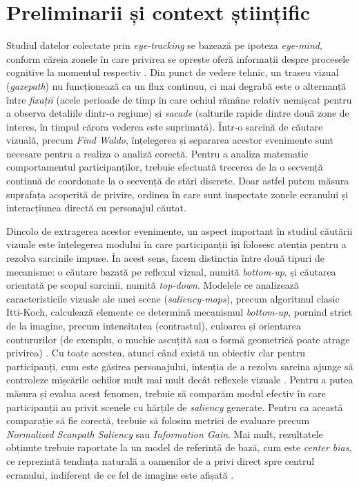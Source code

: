\section{Preliminarii și context științific}

Studiul datelor colectate prin \emph{eye-tracking} se bazează pe ipoteza \emph{eye-mind}, conform căreia zonele în care privirea se oprește oferă informații despre procesele cognitive la momentul respectiv \cite{just1980}. Din punct de vedere tehnic, un traseu vizual (\emph{gazepath}) nu funcționează ca un flux continuu, ci mai degrabă este o alternanță între \emph{fixații} (acele perioade de timp în care ochiul rămâne relativ nemișcat pentru a observa detaliile dintr-o regiune) și \emph{sacade} (salturile rapide dintre două zone de interes, în timpul cărora vederea este suprimată). Într-o sarcină de căutare vizuală, precum \emph{Find Waldo}, înțelegerea și separarea acestor evenimente sunt necesare pentru a realiza o analiză corectă. Pentru a analiza matematic comportamentul participanților, trebuie efectuată trecerea de la o secvență continuă de coordonate la o secvență de stări discrete. Doar astfel putem măsura suprafața acoperită de privire, ordinea în care sunt inspectate zonele ecranului și interacțiunea directă cu personajul căutat.

Dincolo de extragerea acestor evenimente, un aspect important în studiul căutării vizuale este înțelegerea modului în care participanții își folosesc atenția pentru a rezolva sarcinile impuse. În acest sens, facem distincția între două tipuri de mecanisme: o căutare bazată pe reflexul vizual, numită \emph{bottom-up}, și căutarea orientată pe scopul sarcinii, numită \emph{top-down}. Modelele ce analizează caracteristicile vizuale ale unei scene (\emph{saliency-maps}), precum algoritmul clasic Itti-Koch, calculează elemente ce determină mecanismul \emph{bottom-up}, pornind strict de la imagine, precum intensitatea (contrastul), culoarea și orientarea contururilor (de exemplu, o muchie ascuțită sau o formă geometrică poate atrage privirea) \cite{itti1998}. Cu toate acestea, atunci când există un obiectiv clar pentru participanți, cum este găsirea personajului, intenția de a rezolva sarcina ajunge să controleze mișcările ochilor mult mai mult decât reflexele vizuale \cite{henderson2018meaning}. Pentru a putea măsura și evalua acest fenomen, trebuie să comparăm modul efectiv în care participanții au privit scenele cu hărțile de \emph{saliency} generate. Pentru ca această comparație să fie corectă, trebuie să folosim metrici de evaluare precum \emph{Normalized Scanpath Saliency} sau \emph{Information Gain}. Mai mult, rezultatele obținute trebuie raportate la un model de referință de bază, cum este \emph{center bias}, ce reprezintă tendința naturală a oamenilor de a privi direct spre centrul ecranului, indiferent de ce fel de imagine este afișată \cite{bylinskii2019metrics}. 

